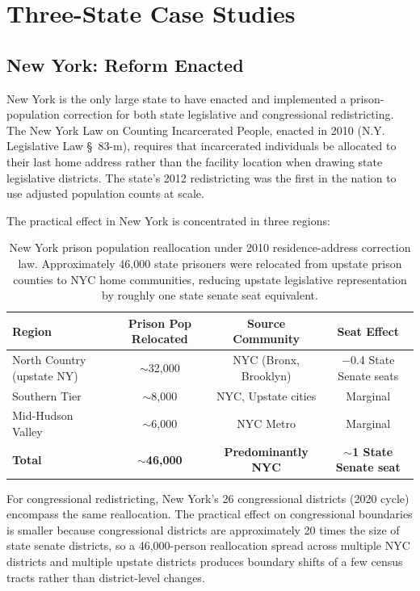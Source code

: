 \section{Three-State Case Studies}
\label{sec:case-studies}

\subsection{New York: Reform Enacted}

New York is the only large state to have enacted and implemented a prison-population correction for both state legislative and congressional redistricting. The New York Law on Counting Incarcerated People, enacted in 2010 (N.Y. Legislative Law \S~83-m), requires that incarcerated individuals be allocated to their last home address rather than the facility location when drawing state legislative districts. The state's 2012 redistricting was the first in the nation to use adjusted population counts at scale.

The practical effect in New York is concentrated in three regions:

\begin{table}[h]
\centering
\begin{tabular}{lccc}
\toprule
\textbf{Region} & \textbf{Prison Pop Relocated} & \textbf{Source Community} & \textbf{Seat Effect} \\
\midrule
North Country (upstate NY) & $\sim$32,000 & NYC (Bronx, Brooklyn) & $-$0.4 State Senate seats \\
Southern Tier & $\sim$8,000 & NYC, Upstate cities & Marginal \\
Mid-Hudson Valley & $\sim$6,000 & NYC Metro & Marginal \\
\midrule
\textbf{Total} & \textbf{$\sim$46,000} & \textbf{Predominantly NYC} & \textbf{$\sim$1 State Senate seat} \\
\bottomrule
\end{tabular}
\caption{New York prison population reallocation under 2010 residence-address correction law. Approximately 46,000 state prisoners were relocated from upstate prison counties to NYC home communities, reducing upstate legislative representation by roughly one state senate seat equivalent.}
\label{tab:ny-reform}
\end{table}

For congressional redistricting, New York's 26 congressional districts (2020 cycle) encompass the same reallocation. The practical effect on congressional boundaries is smaller because congressional districts are approximately 20 times the size of state senate districts, so a 46,000-person reallocation spread across multiple NYC districts and multiple upstate districts produces boundary shifts of a few census tracts rather than district-level changes.

